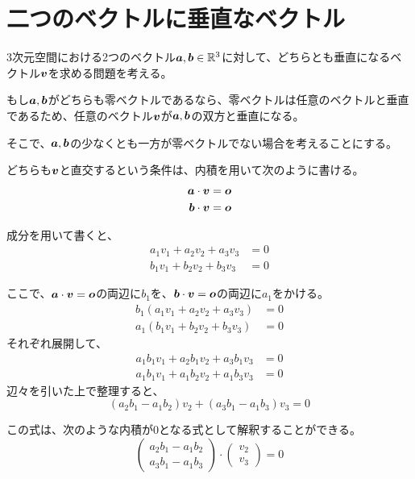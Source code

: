 \documentclass[../../../topic_linear-algebra]{subfiles}
\begin{document}
\sectionline
\section{二つのベクトルに垂直なベクトル}

3次元空間における2つのベクトル$\vb*{a}, \vb*{b} \in \mathbb{R}^3$に対して、どちらとも垂直になるベクトル$\vb*{v}$を求める問題を考える。

\br

もし$\vb*{a}, \vb*{b}$がどちらも零ベクトルであるなら、零ベクトルは任意のベクトルと垂直であるため、任意のベクトル$\vb*{v}$が$\vb*{a}, \vb*{b}$の双方と垂直になる。

\br

そこで、$\vb*{a}, \vb*{b}$の少なくとも一方が零ベクトルでない場合を考えることにする。

\br

どちらも$\vb*{v}$と直交するという条件は、内積を用いて次のように書ける。
\begin{align*}
  \vb*{a} \cdot \vb*{v} &= \vb*{o} \\
  \vb*{b} \cdot \vb*{v} &= \vb*{o}
\end{align*}

成分を用いて書くと、
\begin{align*}
  a_1 v_1 + a_2 v_2 + a_3 v_3 &= 0 \\
  b_1 v_1 + b_2 v_2 + b_3 v_3 &= 0
\end{align*}

ここで、$\vb*{a} \cdot \vb*{v} = \vb*{o}$の両辺に$b_1$を、$\vb*{b} \cdot \vb*{v} = \vb*{o}$の両辺に$a_1$をかける。
\begin{align*}
  b_1 (a_1 v_1 + a_2 v_2 + a_3 v_3) &= 0 \\
  a_1 (b_1 v_1 + b_2 v_2 + b_3 v_3) &= 0
\end{align*}
それぞれ展開して、
\begin{align*}
  a_1 b_1 v_1 + a_2 b_1 v_2 + a_3 b_1 v_3 &= 0 \\
  a_1 b_1 v_1 + a_1 b_2 v_2 + a_1 b_3 v_3 &= 0
\end{align*}
辺々を引いた上で整理すると、
\begin{equation*}
  (a_2 b_1 - a_1 b_2) v_2 + (a_3 b_1 - a_1 b_3) v_3 = 0
\end{equation*}

この式は、次のような内積が0となる式として解釈することができる。
\begin{equation*}
  \begin{pmatrix}
    a_2 b_1 - a_1 b_2 \\
    a_3 b_1 - a_1 b_3
  \end{pmatrix} \cdot \begin{pmatrix}
    v_2 \\
    v_3
  \end{pmatrix} = 0
\end{equation*}
\end{document}
